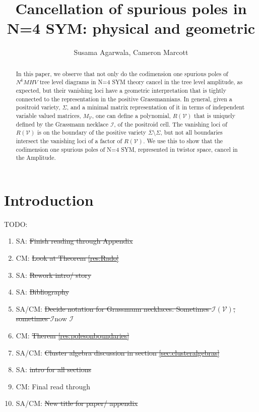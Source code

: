 \documentclass[11pt]{article}
\title{Cancellation of spurious poles in N=4 SYM: physical and geometric}
\author{Susama Agarwala, Cameron Marcott}
\newcommand{\cV}{\mathcal{V}}
\newcommand{\cI}{\mathcal{I}}
\theoremstyle{remark}
\theoremstyle{definition}
\begin{document}
\maketitle
\begin{abstract}
In this paper, we observe that not only do the codimension one spurious poles of $N^kMHV$ tree level diagrams in N=4 SYM theory cancel in the tree level amplitude, as expected, but their vanishing loci have a geometric interpretation that is tightly connected to the representation in the positive Grassmannians. In general, given a positroid variety, $\Sigma$, and a minimal matrix representation of it in terms of independent variable valued matrices, $M_\cV$, one can define a polynomial, $R(\cV)$ that is uniquely defined by the Grassmann necklace $\cI$, of the positroid cell. The vanishing loci of $R(\cV)$ is on the boundary of the positive variety $\overline{\Sigma} \setminus \Sigma$, but not all boundaries intersect the vanishing loci of a factor of $R(\cV)$. We use this to show that the codimension one spurious poles of  N=4 SYM, represented in twistor space, cancel in the Amplitude.
\end{abstract}
\section{Introduction}

TODO:
\begin{enumerate}
\item SA: \st{Finish reading through Appendix}
\item CM: \st{Look at Theorem {\ref{res:Rado}}}
\item SA: \st{Rework intro/ story}
\item SA: \st{Bibliography}
\item SA/CM: \st{Decide notation for Grassmann necklaces. Sometimes $\cI(\cV)$, sometimes $\cI$}now $\cI$
\item CM: \st{Therem {\ref{res:polesonboundaries}}}
\item SA/CM: \st{Cluster algebra discussion in section {\ref{sec:clusteralgebras}}}
\item SA: \st{intro for all sections}
\item CM: Final read through
\item SA/CM: \st{New title for paper/ appendix}

\end{enumerate}
\end{document}
